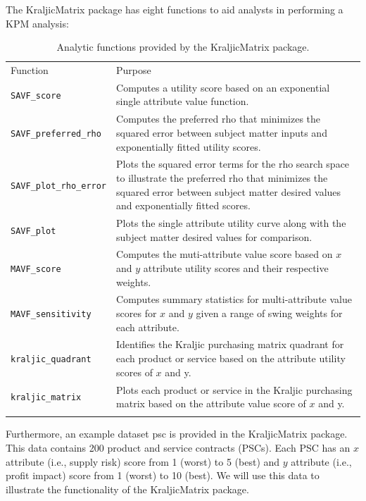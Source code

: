 \documentclass[twocolumn]{svjour3}       %
\begin{document}
The KraljicMatrix package has eight functions to aid analysts in performing a KPM analysis:
\begin{table}[!htb]
  \centering
  \caption{Analytic functions provided by the KraljicMatrix package.}
  \label{tab:1}       %
  \begin{tabular}{lp{10cm}}
    \hline\noalign{\smallskip}
    Function & Purpose  \\
    \noalign{\smallskip}\hline\noalign{\smallskip}
    \texttt{SAVF\_score} & Computes a utility score based on an exponential single attribute value function. \\
    \texttt{SAVF\_preferred\_rho} & Computes the preferred rho that minimizes the squared error between subject matter inputs and exponentially fitted utility scores. \\
    \texttt{\texttt{SAVF\_plot}\_rho\_error} & Plots the squared error terms for the rho search space to illustrate the preferred rho that minimizes the squared error between subject matter desired values and exponentially fitted scores. \\
    \texttt{SAVF\_plot} & Plots the single attribute utility curve along with the subject matter desired values for comparison. \\
    \texttt{MAVF\_score} & Computes the muti-attribute value score based on $x$ and $y$ attribute utility scores and their respective weights. \\
    \texttt{MAVF\_sensitivity} & Computes summary statistics for multi-attribute value scores for $x$ and $y$ given a range of swing weights for each attribute. \\
    \texttt{kraljic\_quadrant} & Identifies the Kraljic purchasing matrix quadrant for each product or service based on the attribute utility scores of $x$ and y. \\
    \texttt{kraljic\_matrix} & Plots each product or service in the Kraljic purchasing matrix based on the attribute value score of $x$ and y. \\
    \noalign{\smallskip}\hline
  \end{tabular}
\end{table}

Furthermore, an example dataset psc is provided in the KraljicMatrix package. This data contains 200 product and service contracts (PSCs). Each PSC has an $x$ attribute (i.e., supply risk) score from 1 (worst) to 5 (best) and $y$ attribute (i.e., profit impact) score from 1 (worst) to 10 (best).  We will use this data to illustrate the functionality of the KraljicMatrix package.
\end{document}
